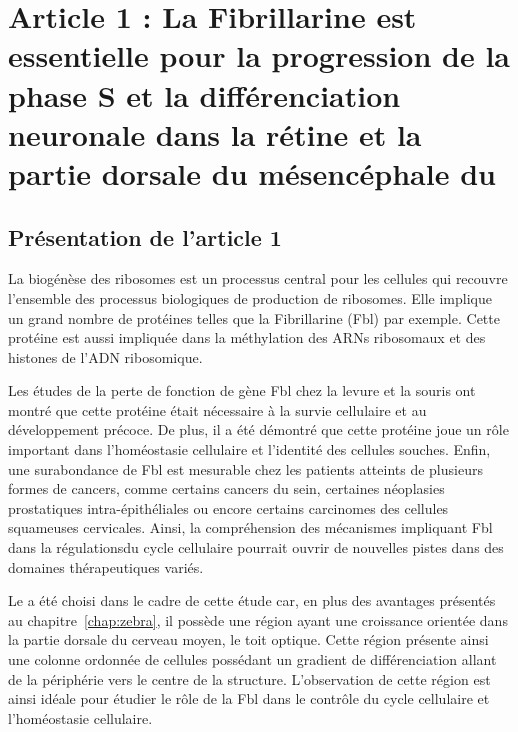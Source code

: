 \documentclass[\main/main.tex]{subfiles}
\begin{document}
\chapter{Article 1 : La
Fibrillarine est essentielle pour la progression de la phase S et la différenciation neuronale dans la rétine et la partie dorsale du mésencéphale du \pz{}
}

\section{Présentation de l'article 1}

\label{sec:bouffard}

%
La biogénèse des ribosomes est un processus central pour les cellules qui recouvre l'ensemble des processus biologiques de production de ribosomes.
%
Elle implique un grand nombre de protéines telles que la Fibrillarine (Fbl) par exemple.
%
Cette protéine est aussi impliquée dans la méthylation des ARNs ribosomaux et des histones de l'ADN ribosomique.

%
Les études de la perte de fonction de gène Fbl chez la levure et la souris ont montré que
cette protéine était nécessaire à la survie cellulaire et au développement précoce.
%
De plus, il a été démontré que cette protéine joue un rôle important dans l'homéostasie cellulaire et l'identité des cellules souches.
%
Enfin, une surabondance de Fbl est mesurable chez les patients atteints de plusieurs formes de cancers, comme certains cancers du sein, certaines néoplasies prostatiques intra-épithéliales ou encore certains carcinomes des cellules squameuses cervicales.
%
Ainsi, la compréhension des mécanismes impliquant Fbl dans la régulationsdu cycle cellulaire pourrait ouvrir de nouvelles pistes dans des domaines thérapeutiques variés.

%
Le \pz{} a été choisi dans le cadre de cette étude car,
en plus des avantages présentés au chapitre~\ref{chap:zebra},
il possède une région ayant une croissance orientée dans la partie dorsale du cerveau moyen, le toit optique.
%
Cette région présente ainsi une colonne ordonnée de cellules possédant
un gradient de différenciation allant de la périphérie vers le centre de la structure.
%
L'observation de cette région est ainsi idéale pour étudier le rôle de la Fbl
dans le contrôle du cycle cellulaire et l'homéostasie cellulaire.
%
\end{document}
